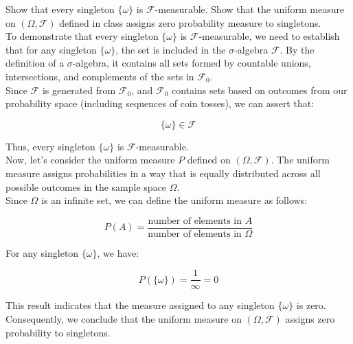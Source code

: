 \begin{example}
    Show that every singleton \( \{\omega\} \) is \( \mathcal{F} \)-measurable. Show that the uniform measure on \( (\Omega, \mathcal{F}) \) defined in class assigns zero probability measure to singletons.\\

    To demonstrate that every singleton \( \{\omega\} \) is \( \mathcal{F} \)-measurable, we need to establish that for any singleton \( \{\omega\} \), the set is included in the \( \sigma \)-algebra \( \mathcal{F} \). By the definition of a \( \sigma \)-algebra, it contains all sets formed by countable unions, intersections, and complements of the sets in \( \mathcal{F}_0 \).\\

Since \( \mathcal{F} \) is generated from \( \mathcal{F}_0 \), and \( \mathcal{F}_0 \) contains sets based on outcomes from our probability space (including sequences of coin tosses), we can assert that:

\[
\{\omega\} \in \mathcal{F}
\]

Thus, every singleton \( \{\omega\} \) is \( \mathcal{F} \)-measurable.\\

Now, let's consider the uniform measure \( P \) defined on \( (\Omega, \mathcal{F}) \). The uniform measure assigns probabilities in a way that is equally distributed across all possible outcomes in the sample space \( \Omega \).\\

Since \( \Omega \) is an infinite set, we can define the uniform measure as follows:

\[
P(A) = \frac{\text{number of elements in } A}{\text{number of elements in } \Omega}
\]

For any singleton \( \{\omega\} \), we have:

\[
P(\{\omega\}) = \frac{1}{\infty} = 0
\]

This result indicates that the measure assigned to any singleton \( \{\omega\} \) is zero. Consequently, we conclude that the uniform measure on \( (\Omega, \mathcal{F}) \) assigns zero probability to singletons.

\end{example}

